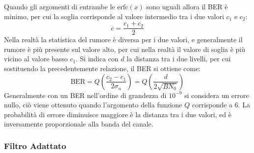 \documentclass{article}
\numberwithin{equation}{subsection}
\begin{document}
Quando gli argomenti di entrambe le $\mathrm{erfc}(x)$ sono uguali allora il BER è minimo, per cui la soglia corrisponde al valore intermedio tra i due valori $c_1$ e $c_2$:
\begin{equation}
    \overline{c}=\displaystyle\frac{c_1+c_2}{2}
\end{equation}
Nella realtà la statistica del rumore è diversa per i due valori, e generalmente il rumore è più presente sul valore alto, per cui nella realtà il valore di soglia è 
più vicino al valore basso $c_1$.  
Si indica con $d$ la distanza tra i due livelli, per cui sostituendo la precedentemente relazione, il BER si ottiene come:
\begin{equation}
    \mathrm{BER}=Q\left(\frac{c_2-c_1}{2\sigma_n}\right)=Q\left(\frac{d}{2\sqrt{BN_0}}\right)
\end{equation}
Generalmente con un BER nell'ordine di grandezza di $10^{-9}$ si considera un errore nullo, ciò viene ottenuto quando l'argomento della funzione $Q$ corrisponde a $6$. 
La probabilità di errore diminuisce maggiore è la distanza tra i due valori, ed è inversamente proporzionale alla banda del canale. 

\subsubsection{Filtro Adattato}
\end{document}
